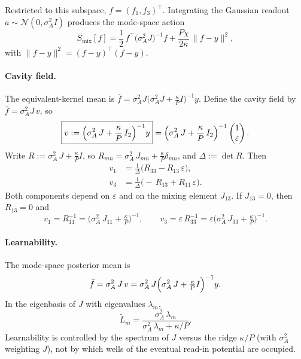 \documentclass[11pt,a4paper]{article}
\begin{document}
Restricted to this subspace, $f=(f_1,f_3)^\top$.
Integrating the Gaussian readout $a\sim\mathcal{N}(0,\sigma_A^2 I)$ produces the mode-space action
\begin{equation}
  S_{\mathrm{mix}}[f]
  =
  \frac12\,
  f^\top
  \bigl(\sigma_A^2 J\bigr)^{-1}
  f
  +
  \frac{P\chi}{2\kappa}\,
  \lVert f-y\rVert^2,
  \label{eq:Smix-raw}
\end{equation}
with $\lVert f-y\rVert^2=(f-y)^\top(f-y)$.

\paragraph{Cavity field.}
The equivalent-kernel mean is
$\bar f=\sigma_A^2 J\bigl(\sigma_A^2 J+\tfrac{\kappa}{P}I\bigr)^{-1}y$.
Define the cavity field by $\bar f=\sigma_A^2 J\,v$, so
\begin{equation}
  \boxed{
  v
  :=
  \Bigl(
    \sigma_A^2\, J
    +
    \frac{\kappa}{P}\, I_2
  \Bigr)^{-1}
  y
  }
  =
  \Bigl(
    \sigma_A^2\, J
    +
    \frac{\kappa}{P}\, I_2
  \Bigr)^{-1}
  \begin{pmatrix} 1\\ \varepsilon\end{pmatrix}.
  \label{eq:v}
\end{equation}
Write $R := \sigma_A^2\, J + \tfrac{\kappa}{P} I$, so
$R_{mn}=\sigma_A^2\, J_{mn}+\tfrac{\kappa}{P}\delta_{mn}$, and $\Delta:=\det R$.
Then
\begin{align}
  v_1
  &=
  \frac{1}{\Delta}
  \bigl(
    R_{33}
    -
    R_{13}\,\varepsilon
  \bigr),
  \label{eq:v1}\\
  v_3
  &=
  \frac{1}{\Delta}
  \bigl(
    -\,R_{13}
    +
    R_{11}\,\varepsilon
  \bigr).
  \label{eq:v3}
\end{align}
Both components depend on $\varepsilon$ and on the mixing element $J_{13}$.
If $J_{13}=0$, then $R_{13}=0$ and
\begin{equation}
  v_1
  =
  R_{11}^{-1}
  =
  \bigl(\sigma_A^2\, J_{11}+\tfrac{\kappa}{P}\bigr)^{-1},
  \qquad
  v_3
  =
  \varepsilon\,
  R_{33}^{-1}
  =
  \varepsilon
  \bigl(\sigma_A^2\, J_{33}+\tfrac{\kappa}{P}\bigr)^{-1}.
\end{equation}

\paragraph{Learnability.}
The mode-space posterior mean is
\begin{equation}
  \bar f
  =
  \sigma_A^2\, J\, v
  =
  \sigma_A^2\, J
  \Bigl(\sigma_A^2\, J+\tfrac{\kappa}{P}I\Bigr)^{-1} y.
  \label{eq:learn}
\end{equation}
In the eigenbasis of $J$ with eigenvalues $\lambda_m$,
\begin{equation}
  \tilde L_m
  =
  \frac{\sigma_A^2\,\lambda_m}{\sigma_A^2\,\lambda_m+\kappa/P}.
\end{equation}
Learnability is controlled by the spectrum of $J$ versus the ridge $\kappa/P$
(with $\sigma_A^2$ weighting $J$), not by which wells of the eventual read-in potential
are occupied.
\end{document}
